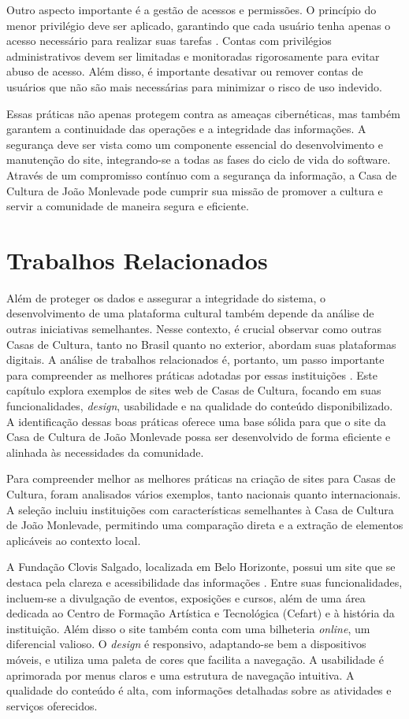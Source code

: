 Outro aspecto importante é a gestão de acessos e permissões. O princípio do menor privilégio deve ser aplicado, garantindo que cada usuário tenha apenas o acesso necessário para realizar suas tarefas \cite{schneider2003least}. Contas com privilégios administrativos devem ser limitadas e monitoradas rigorosamente para evitar abuso de acesso. Além disso, é importante desativar ou remover contas de usuários que não são mais necessárias para minimizar o risco de uso indevido.

Essas práticas não apenas protegem contra as ameaças cibernéticas, mas também garantem a continuidade das operações e a integridade das informações. A segurança deve ser vista como um componente essencial do desenvolvimento e manutenção do site, integrando-se a todas as fases do ciclo de vida do software. Através de um compromisso contínuo com a segurança da informação, a Casa de Cultura de João Monlevade pode cumprir sua missão de promover a cultura e servir a comunidade de maneira segura e eficiente.

\section{Trabalhos Relacionados}

Além de proteger os dados e assegurar a integridade do sistema, o desenvolvimento de uma plataforma cultural também depende da análise de outras iniciativas semelhantes. Nesse contexto, é crucial observar como outras Casas de Cultura, tanto no Brasil quanto no exterior, abordam suas plataformas digitais. A análise de trabalhos relacionados é, portanto, um passo importante para compreender as melhores práticas adotadas por essas instituições \cite{boud2003learning}. Este capítulo explora exemplos de sites web de Casas de Cultura, focando em suas funcionalidades, \textit{design}, usabilidade e na qualidade do conteúdo disponibilizado. A identificação dessas boas práticas oferece uma base sólida para que o site da Casa de Cultura de João Monlevade possa ser desenvolvido de forma eficiente e alinhada às necessidades da comunidade.

Para compreender melhor as melhores práticas na criação de sites para Casas de Cultura, foram analisados vários exemplos, tanto nacionais quanto internacionais. A seleção incluiu instituições com características semelhantes à Casa de Cultura de João Monlevade, permitindo uma comparação direta e a extração de elementos aplicáveis ao contexto local.

A Fundação Clovis Salgado, localizada em Belo Horizonte, possui um site que se destaca pela clareza e acessibilidade das informações \cite{fcs}. Entre suas funcionalidades, incluem-se a divulgação de eventos, exposições e cursos, além de uma área dedicada ao Centro de Formação Artística e Tecnológica (Cefart) e à história da instituição. Além disso o site também conta com uma bilheteria \textit{online}, um diferencial valioso. O \textit{design} é responsivo, adaptando-se bem a dispositivos móveis, e utiliza uma paleta de cores que facilita a navegação. A usabilidade é aprimorada por menus claros e uma estrutura de navegação intuitiva. A qualidade do conteúdo é alta, com informações detalhadas sobre as atividades e serviços oferecidos.

